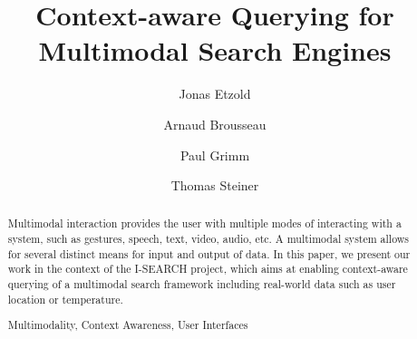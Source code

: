 \documentclass[runningheads,a4paper]{llncs} \usepackage[utf8]{inputenc}
\newcommand{\keywords}[1]{\par\addvspace\baselineskip
\noindent\keywordname\enspace\ignorespaces#1}
\begin{document}
\mainmatter  %

\title{Context-aware Querying for\\ Multimodal Search Engines}


\author{Jonas Etzold \and Arnaud Brousseau \and Paul Grimm \and Thomas Steiner}



\maketitle

\begin{abstract}
Multimodal interaction provides the user with multiple modes of interacting with a system, such as gestures, speech, text, video, audio, etc. A multimodal system allows for several distinct means for input and output of data. In this paper, we present our work in the context of the \mbox{I-SEARCH} project, which aims at enabling context-aware querying of a multimodal search framework including real-world data such as user location or temperature. 

\keywords{Multimodality, Context Awareness, User Interfaces}
\end{abstract}
\end{document}
